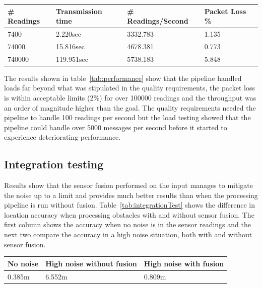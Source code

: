\documentclass[prodmode,acmtosem]{acmsmall} %
\begin{document}
\begin{center}
\def\arraystretch{1.5}
\begin{tabularx}{\textwidth}{| p{6em} | p{7em} | X | X |} 

\hline
\textbf{\# Readings} & \textbf{Transmission time} & \textbf{\# Readings/Second} & \textbf{Packet Loss \%} \\
\hline
7400 & 2.220sec & 3332.783 & 1.135 \\
\hline
74000 & 15.816sec & 4678.381 & 0.773 \\
\hline
740000 & 119.951sec & 5738.183 & 5.848 \\
\hline
\end{tabularx}
\label{tab:performance}
\end{center}

The results shown in table~\ref{tab:performance} show that the pipeline handled loads far beyond what was stipulated in the quality requirements, the packet loss is within acceptable limits (2\%) for over 100000 readings and the throughput was an order of magnitude higher than the goal. The quality requirements needed the pipeline to handle 100 readings per second but the load testing showed that the pipeline could handle over 5000 messages per second before it started to experience deteriorating performance.

\subsection{Integration testing}
Results show that the sensor fusion performed on the input manages to mitigate the noise up to a limit and provides much better results than when the processing pipeline is run without fusion. Table~\ref{tab:integrationTest} shows the difference in location accuracy when processing obstacles with and without sensor fusion. The first column shows the accuracy when no noise is in the sensor readings and the next two compare the accuracy in a high noise situation, both with and without sensor fusion. 

\begin{center}
\def\arraystretch{1.5}
\label{tab:integrationTest}
\begin{tabularx}{\textwidth}{| p{6em} | X | X |}

\hline
\textbf{No noise} & \textbf{High noise without fusion}  & \textbf{High noise with fusion} \\
\hline
0.385m & 6.552m & 0.809m \\
\hline
\end{tabularx}
\label{tab:performance}
\end{center}
\end{document}
